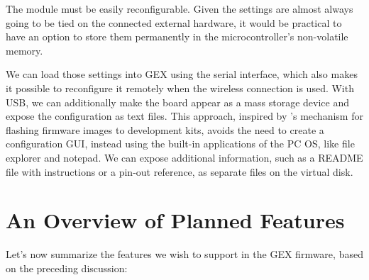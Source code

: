 The module must be easily reconfigurable. Given the settings are almost always going to be tied on the connected external hardware, it would be practical to have an option to store them permanently in the microcontroller's non-volatile memory.

We can load those settings into GEX using the serial interface, which also makes it possible to reconfigure it remotely when the wireless connection is used. With USB, we can additionally make the board appear as a mass storage device and expose the configuration as text files. This approach, inspired by \mbed's mechanism for flashing firmware images to development kits, avoids the need to create a configuration \gls{GUI}, instead using the built-in applications of the \gls{PC} \gls{OS}, like file explorer and notepad. We can expose additional information, such as a README file with instructions or a pin-out reference, as separate files on the virtual disk.

\section{An Overview of Planned Features}

Let's now summarize the features we wish to support in the GEX firmware, based on the preceding discussion:

